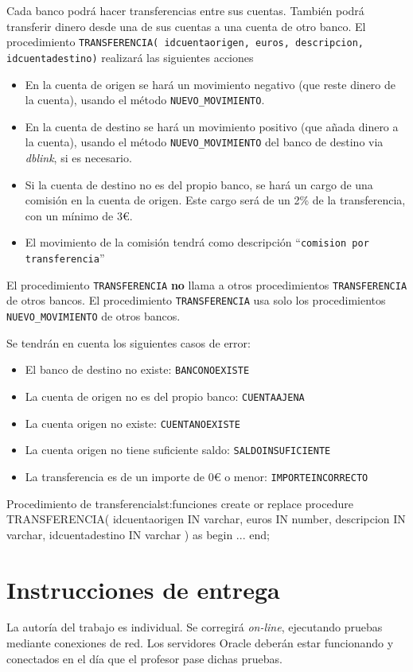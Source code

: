 \begin{homeworkProblem}
Cada banco podrá hacer transferencias entre sus cuentas. También podrá transferir dinero desde una de sus cuentas a una cuenta de otro banco. El procedimiento \texttt{TRANSFERENCIA( idcuentaorigen, euros, descripcion, idcuentadestino)} realizará las siguientes acciones
\begin{itemize}
\item En la cuenta de origen se hará un movimiento negativo (que reste dinero de la cuenta), usando el método \texttt{NUEVO\_MOVIMIENTO}.
\item En la cuenta de destino se hará un movimiento positivo (que añada dinero a la cuenta), usando el método \texttt{NUEVO\_MOVIMIENTO} del banco de destino via \textit{dblink}, si es necesario.
\item Si la cuenta de destino no es del propio banco, se hará un cargo de una comisión en la cuenta de origen. Este cargo será de un 2\% de la transferencia, con un mínimo de 3\euro.
\item El movimiento de la comisión tendrá como descripción ``\texttt{comision por transferencia}''  
\end{itemize}

\begin{Aviso}
  El procedimiento \texttt{TRANSFERENCIA} \textbf{no} llama a otros procedimientos \texttt{TRANSFERENCIA} de otros bancos.
  El procedimiento \texttt{TRANSFERENCIA} usa solo los procedimientos \texttt{NUEVO\_MOVIMIENTO} de otros bancos.
\end{Aviso}


Se tendrán en cuenta los siguientes casos de error:
\begin{itemize}
\item El banco de destino no existe: \texttt{BANCONOEXISTE}
\item La cuenta de origen no es del propio banco: \texttt{CUENTAAJENA}
\item La cuenta origen no existe: \texttt{CUENTANOEXISTE}
\item La cuenta origen no tiene suficiente saldo: \texttt{SALDOINSUFICIENTE}
\item La transferencia es de un importe de 0{\euro} o menor: \texttt{IMPORTEINCORRECTO}
\end{itemize}

  \begin{listadosql}{Procedimiento de transferencia}{lst:funciones}
create or replace procedure TRANSFERENCIA(
  idcuentaorigen IN varchar, 
  euros IN number,
  descripcion IN varchar,
  idcuentadestino IN varchar )
as begin
  ...
end; 

\end{listadosql}


\end{homeworkProblem}


\section{Instrucciones de entrega}
La autoría del trabajo es individual. Se corregirá \textit{on-line}, ejecutando pruebas mediante conexiones de red. Los servidores Oracle deberán estar funcionando y conectados en el día que el profesor pase dichas pruebas.








